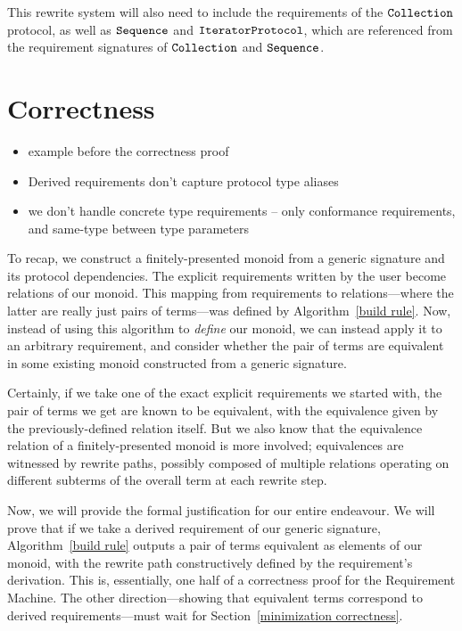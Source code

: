 \documentclass[../generics]{subfiles}
\begin{document}
This rewrite system will also need to include the requirements of the $\texttt{Collection}$ protocol, as well as $\texttt{Sequence}$ and $\texttt{IteratorProtocol}$, which are referenced from the requirement signatures of $\texttt{Collection}$ and $\texttt{Sequence}$.

\section{Correctness}

\begin{itemize}
\item example before the correctness proof
\item Derived requirements don’t capture protocol type aliases
\item we don't handle concrete type requirements -- only conformance requirements, and same-type between type parameters
\end{itemize}

To recap, we construct a finitely-presented monoid from a generic signature and its protocol dependencies. The explicit requirements written by the user become relations of our monoid. This mapping from requirements to relations---where the latter are really just pairs of terms---was defined by Algorithm~\ref{build rule}. Now, instead of using this algorithm to \emph{define} our monoid, we can instead apply it to an arbitrary requirement, and consider whether the pair of terms are equivalent in some existing monoid constructed from a generic signature.

Certainly, if we take one of the exact explicit requirements we started with, the pair of terms we get are known to be equivalent, with the equivalence given by the previously-defined relation itself. But we also know that the equivalence relation of a finitely-presented monoid is more involved; equivalences are witnessed by rewrite paths, possibly composed of multiple relations operating on different subterms of the overall term at each rewrite step.

Now, we will provide the formal justification for our entire endeavour. We will prove that if we take a derived requirement of our generic signature, Algorithm~\ref{build rule} outputs a pair of terms equivalent as elements of our monoid, with the rewrite path constructively defined by the requirement's derivation. This is, essentially, one half of a correctness proof for the Requirement Machine. The other direction---showing that equivalent terms correspond to derived requirements---must wait for Section~\ref{minimization correctness}.
\end{document}
